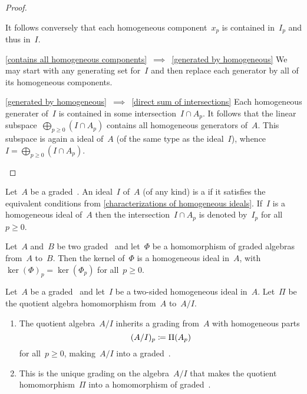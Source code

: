 \begin{proof}
\begin{enumerate}
\begin{implicationlist}
          It follows conversely that each homogeneous component~$x_p$ is contained in~$I_p$ and thus in~$I$.
        \item[\ref*{contains all homogeneous components}~$\implies$~\ref*{generated by homogeneous}]
          We may start with any generating set for~$I$ and then replace each generator by all of its homogeneous components.
        \item[\ref*{generated by homogeneous}~$\implies$~\ref*{direct sum of intersections}]
          Each homogeneous generater of~$I$ is contained in some intersection~$I \cap A_p$.
          It follows that the linear subspace~$\bigoplus_{p \geq 0} (I \cap A_p)$ contains all homogeneous generators of~$A$.
          This subspace is again a ideal of~$A$ (of the same type as the ideal~$I$), whence~$I = \bigoplus_{p \geq 0} (I \cap A_p)$.
        \qedhere
      \end{implicationlist}
  \end{enumerate}
\end{proof}


\begin{definition}
  Let~$A$ be a graded~\algebra{$\kf$}.
  An ideal~$I$ of~$A$ (of any kind) is a  if it satisfies the equivalent conditions from \cref{characterizations of homogeneous ideals}.
  If~$I$ is a homogeneous ideal of~$A$ then the intersection~$I \cap A_p$ is denoted by~$I_p$ for all~$p \geq 0$.
\end{definition}


\begin{example}
  Let~$A$ and~$B$ be two graded~\algebras{$\kf$} and let~$\Phi$ be a homomorphism of graded algebras from~$A$ to~$B$.
  Then the kernel of~$\Phi$ is a homogeneous ideal in~$A$, with~$\ker(\Phi)_p = \ker( \Phi_p )$ for all~$p \geq 0$.
\end{example}


\begin{proposition}
  Let~$A$ be a graded~\algebra{$\kf$} and let~$I$ be a two-sided homogeneous ideal in~$A$.
  Let~$\Pi$ be the quotient algebra homomorphism from~$A$ to~$A/I$.
  \begin{enumerate}
    \item
      The quotient algebra~$A/I$ inherits a grading from~$A$ with homogeneous parts
      \[
        (A/I)_p \coloneqq \Pi(A_p)
      \]
      for all~$p \geq 0$, making~$A/I$ into a graded~\algebra{$\kf$}.
    \item
      This is the unique grading on the algebra~$A/I$ that makes the quotient homomorphism~$\Pi$ into a homomorphism of graded~\algebras{$\kf$}.
  \end{enumerate}
\end{proposition}


